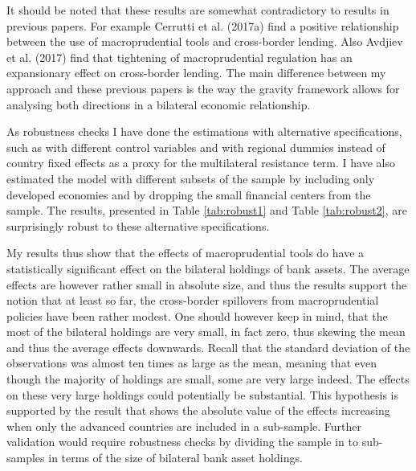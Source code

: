 \documentclass[12pt,a4paper]{article}
\begin{document}
It should be noted that these results are somewhat contradictory to results in previous papers. For example Cerrutti et al. (2017a) find a positive relationship between the use of macroprudential tools and cross-border lending. Also Avdjiev et al. (2017) find that tightening of macroprudential regulation has an expansionary effect on cross-border lending. The main difference between my approach and these previous papers is the way the gravity framework allows for analysing both directions in a bilateral economic relationship.  

As robustness checks I have done the estimations with alternative specifications, such as with different control variables and with regional dummies instead of country fixed effects as a proxy for the multilateral resistance term. I have also estimated the model with different subsets of the sample by including only developed economies and by dropping the small financial centers from the sample. The results, presented in Table \ref{tab:robust1} and Table \ref{tab:robust2}, are surprisingly robust to these alternative specifications. 

My results thus show that the effects of macroprudential tools do have a statistically significant effect on the bilateral holdings of bank assets. The average effects are however rather small in absolute size, and thus the results support the notion that at least so far, the cross-border spillovers from macroprudential policies have been rather modest. One should however keep in mind, that the most of the bilateral holdings are very small, in fact zero, thus skewing the mean and thus the average effects downwards. Recall that the standard deviation of the observations was almost ten times as large as the mean, meaning that even though the majority of holdings are small, some are very large indeed. The effects on these very large holdings could potentially be substantial. This hypothesis is supported by the result that shows the absolute value of the effects increasing when only the advanced countries are included in a sub-sample. Further validation would require robustness checks by dividing the sample in to sub-samples in terms of the size of bilateral bank asset holdings.
\end{document}
